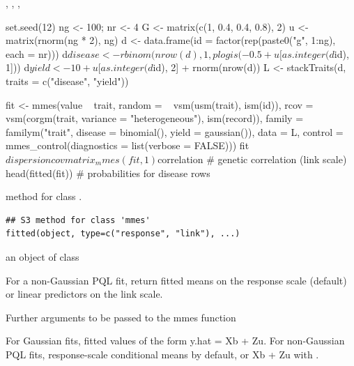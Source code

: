 \documentclass[a4paper]{book}
\begin{document}
%
\begin{SeeAlso}\relax
{}, , ,
\end{SeeAlso}
%
\begin{Examples}
\begin{ExampleCode}
set.seed(12)
ng <- 100; nr <- 4
G <- matrix(c(1, 0.4, 0.4, 0.8), 2)
u <- matrix(rnorm(ng * 2), ng) %
d <- data.frame(id = factor(rep(paste0("g", 1:ng), each = nr)))
d$disease <- rbinom(nrow(d), 1, plogis(-0.5 + u[as.integer(d$id), 1]))
d$yield <- 10 + u[as.integer(d$id), 2] + rnorm(nrow(d))
L <- stackTraits(d, traits = c("disease", "yield"))

fit <- mmes(value ~ trait,
  random = ~ vsm(usm(trait), ism(id)),
  rcov = ~ vsm(corgm(trait, variance = "heterogeneous"), ism(record)),
  family = familym("trait", disease = binomial(), yield = gaussian()),
  data = L,
  control = mmes_control(diagnostics = list(verbose = FALSE)))
fit$dispersion
covmatrix_mmes(fit, 1)$correlation   # genetic correlation (link scale)
head(fitted(fit))                    # probabilities for disease rows
\end{ExampleCode}
\end{Examples}
%
\begin{Description}\relax
{} method for class .
\end{Description}
%
\begin{Usage}
\begin{verbatim}
## S3 method for class 'mmes'
fitted(object, type=c("response", "link"), ...)
\end{verbatim}
\end{Usage}
%
\begin{Arguments}
\begin{ldescription}
\item[\code{object}] an object of class 
\item[\code{type}] For a non-Gaussian PQL fit, return fitted means on the response
scale (default) or linear predictors on the link scale.
\item[\code{...}] Further arguments to be passed to the mmes function
\end{ldescription}
\end{Arguments}
%
\begin{Value}
For Gaussian fits, fitted values of the form y.hat = Xb + Zu. For non-Gaussian
PQL fits, response-scale conditional means by default, or Xb + Zu with
.

\end{Value}
\end{document}
